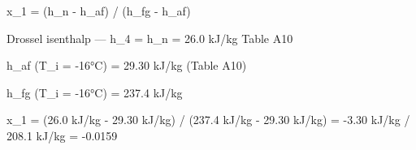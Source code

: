 x_1 = (h_n - h_af) / (h_fg - h_af)  

Drossel isenthalp — h_4 = h_n = 26.0 kJ/kg  
Table A10  

h_af (T_i = -16°C) = 29.30 kJ/kg  
(Table A10)  

h_fg (T_i = -16°C) = 237.4 kJ/kg  

x_1 = (26.0 kJ/kg - 29.30 kJ/kg) / (237.4 kJ/kg - 29.30 kJ/kg) = -3.30 kJ/kg / 208.1 kJ/kg = -0.0159